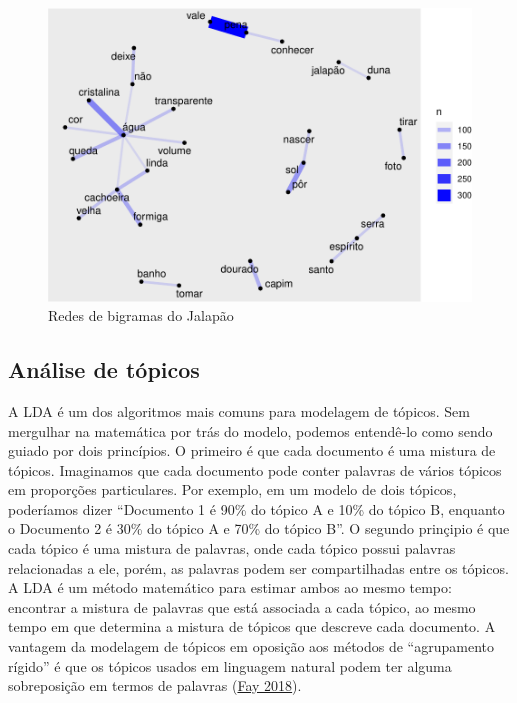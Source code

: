 \documentclass[preprint, 3p,
authoryear]{elsarticle} %
\begin{document}
\begin{figure}[H]

{\centering \includegraphics{bookdown-artigo_files/figure-latex/fig7-1} 

}

\caption{Redes de bigramas do Jalapão}\label{fig:fig7}
\end{figure}

\hypertarget{anuxe1lise-de-tuxf3picos}{%
\subsection{Análise de tópicos}\label{anuxe1lise-de-tuxf3picos}}

A LDA é um dos algoritmos mais comuns para modelagem de tópicos. Sem
mergulhar na matemática por trás do modelo, podemos entendê-lo como
sendo guiado por dois princípios. O primeiro é que cada documento é uma
mistura de tópicos. Imaginamos que cada documento pode conter palavras
de vários tópicos em proporções particulares. Por exemplo, em um modelo
de dois tópicos, poderíamos dizer ``Documento 1 é 90\% do tópico A e
10\% do tópico B, enquanto o Documento 2 é 30\% do tópico A e 70\% do
tópico B''. O segundo prinçipio é que cada tópico é uma mistura de
palavras, onde cada tópico possui palavras relacionadas a ele, porém, as
palavras podem ser compartilhadas entre os tópicos. A LDA é um método
matemático para estimar ambos ao mesmo tempo: encontrar a mistura de
palavras que está associada a cada tópico, ao mesmo tempo em que
determina a mistura de tópicos que descreve cada documento. A vantagem
da modelagem de tópicos em oposição aos métodos de ``agrupamento
rígido'' é que os tópicos usados em linguagem natural podem ter alguma
sobreposição em termos de palavras (\protect\hyperlink{ref-Fay2018}{Fay
2018}).
\end{document}
